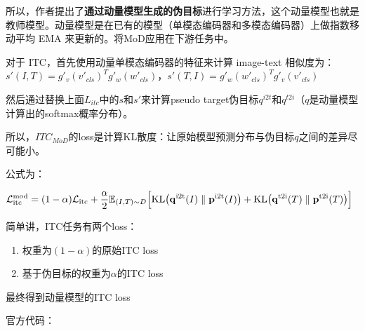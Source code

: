 \documentclass[zihao=false,fontset=windows]{ctexart}
\newcommand{\bigmath}[1]{%
  \begin{center}\large$\displaystyle #1$\end{center}%
}
\begin{document}
\vspace{0.45em}
所以，作者提出了\textbf{通过动量模型生成的伪目标}进行学习方法，这个动量模型也就是教师模型。动量模型是在已有的模型（单模态编码器和多模态编码器）上做指数移动平均 EMA 来更新的。将MoD应用在下游任务中。\par
对于 ITC，首先使用动量单模态编码器的特征来计算 image-text 相似度为：$s'(I,T)=g'_v(v'_{cls})^T g'_w(w'_{cls})$，$s'(T,I)=g'_w(w'_{cls})^T g'_v(v'_{cls})$\par
然后通过替换上面$L_{itc}$中的$s$和$s'$来计算pseudo target伪目标$q^{i2t}$和$q^{t2i}$（$q$是动量模型计算出的softmax概率分布）。\par
所以，$ITC_{MoD}$的loss是计算KL散度：让原始模型预测分布与伪目标$q$之间的差异尽可能小。\par
公式为：\par
\bigmath{
\mathcal{L}_{\mathrm{itc}}^{\mathrm{mod}}=(1-\alpha)\mathcal{L}_{\mathrm{itc}}+\frac{\alpha}{2}\mathbb{E}_{(I,T)\sim D}\Bigl[\mathrm{KL}\bigl(\mathbf{q}^{\mathrm{i2t}}(I)\parallel\mathbf{p}^{\mathrm{i2t}}(I)\bigr)+\mathrm{KL}\bigl(\mathbf{q}^{\mathrm{t2i}}(T)\parallel\mathbf{p}^{\mathrm{t2i}}(T)\bigr)\Bigr]
}
\begin{feishuquote}
简单讲，ITC任务有两个loss：\par
\begin{enumerate}
\item 权重为$(1-\alpha)$的原始ITC loss
\item 基于伪目标的权重为$\alpha$的ITC loss
\end{enumerate}
最终得到动量模型的ITC loss\par
\end{feishuquote}
官方代码：\par
\end{document}
